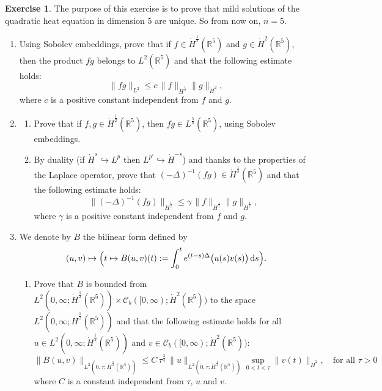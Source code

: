 \documentclass[a4paper, 12pt]{article}
\theoremstyle{plain}
\theoremstyle{definition}
\newtheorem{exercise}{Exercise}
\theoremstyle{remark}
\numberwithin{equation}{section}
\begin{document}
\begin{exercise}
The purpose of this exercise is to prove that mild solutions of the quadratic heat equation in dimension $5$ are unique. So from now on, $n=5$.
%
\begin{enumerate}
\item 
Using Sobolev embeddings, prove that if $f\in \dot H^{\frac{1}{2}}({\mathds{R}}^5)$ and $g\in \dot H^2({\mathds{R}}^5)$, then the product
$fg$ belongs to $L^2({\mathds{R}}^5)$ and that the following estimate holds:
%
\begin{equation}
\label{eq:uvL^2}
\|fg\|_{L^2}\le c\,\|f\|_{\dot H^{\frac{1}{2}}}\|g\|_{\dot H^2},
\end{equation}
%
where $c$ is a positive constant independent from $f$ and $g$.
\item
\begin{enumerate}
\item 
Prove that if $f,g\in \dot H^{\frac{1}{2}}({\mathds{R}}^5)$, then $fg \in L^{\frac{5}{4}}({\mathds{R}}^5)$,
using Sobolev embeddings.
\item 
By duality (if $\dot H^s\hookrightarrow L^p$ then $L^{p'}\hookrightarrow \dot H^{-s}$)
and thanks to the properties of the Laplace operator, prove that
$(-\Delta)^{-1}(fg)\in \dot H^{\frac{1}{2}}({\mathds{R}}^5)$
and that the following estimate holds:
%
\begin{equation}
\label{eq:uvH-3/2}
\|(-\Delta)^{-1}(fg)\|_{\dot H^{\frac{1}{2}}}\le \gamma \, \|f\|_{\dot H^{\frac{1}{2}}}\|g\|_{\dot H^{\frac{1}{2}}},
\end{equation}
%
where $\gamma$ is a positive constant independent from $f$ and $g$.
\end{enumerate}
%
\item
We denote by $B$ the bilinear form defined by 
\[
(u,v) \mapsto \Bigl(t\mapsto B(u,v)(t):=\int_0^te^{(t-s)\Delta}\bigl(u(s)v(s)\bigr)\,{\rm d}s\Bigr).
\]
\begin{enumerate}
\item
Prove that $B$ is bounded from $L^2(0,\infty;\dot H^{\frac{1}{2}}({\mathds{R}}^5))\times {\mathscr{C}}_b([0,\infty);\dot H^2({\mathds{R}}^5))$
to the space $L^2(0,\infty;\dot H^{\frac{1}{2}}({\mathds{R}}^5))$ and that the following estimate holds for all 
$u\in L^2(0,\infty;\dot H^{\frac{1}{2}}({\mathds{R}}^5))$ and
$v\in {\mathscr{C}}_b([0,\infty);\dot H^2({\mathds{R}}^5))$:
\[
\|B(u,v)\|_{L^2(0,\tau;\dot H^{\frac{1}{2}}({\mathds{R}}^5))}\le 
C\, \tau^{\frac{3}{4}}\,\|u\|_{L^2(0,\tau;\dot H^{\frac{1}{2}}({\mathds{R}}^5))} \sup_{0<t<\tau}\|v(t)\|_{\dot H^2}, \quad \mbox{for all }\tau>0
\]
where $C$ is a constant independent from $\tau$, $u$ and $v$.


\end{enumerate}
\end{enumerate}
\end{exercise}
\end{document}
